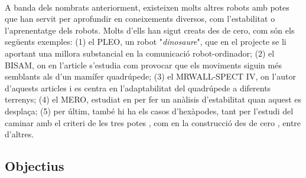 \documentclass[12pt,a4paper,final,twoside]{article}
\begin{document}
\paragraph{}A banda dels nombrats anteriorment, existeixen molts altres robots amb potes que han servit per aprofundir en coneixements diversos, com l'estabilitat o l'aprenentatge dels robots. Molts d'ells han sigut creats des de cero, com són els següents exemples: (1) el PLEO, un robot "\textit{dinosaure}", que en el projecte \cite{Menendez2011} se li aportant una millora substancial en la comunicació robot-ordinador; (2) el BISAM, on en l'article \cite{Albiez2003} s'estudia com provocar que els moviments siguin més semblants als d'un mamífer quadrúpede; (3) el MRWALL-SPECT IV, on l'autor d'aquests articles \cite{Loc2010} i \cite{Loc2011} es centra en l'adaptabilitat del quadrúpede a diferents terrenys; (4) el MERO, estudiat en \cite{Ion} per fer un anàlisis d'estabilitat quan aquest es desplaça; (5) per últim, també hi ha els casos d'hexàpodes, tant per l'estudi del caminar amb el criteri de les tres potes \cite{Lee1988}, com en la construcció des de cero \cite{Lojo2009}, entre d'altres. 

\paragraph{}



\label{Objectius}
\subsection*{Objectius}
\end{document}

